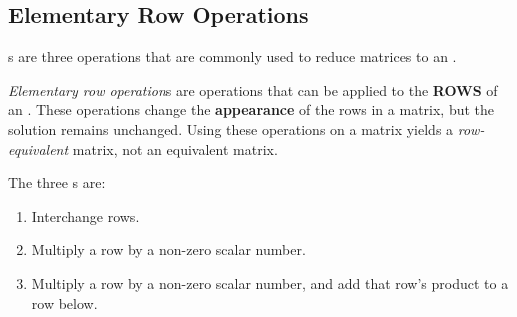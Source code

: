 \subsection{Elementary Row Operations}\label{subsec:Elementary_Row_Ops}
s are three operations that are commonly used to reduce matrices to an .

\begin{definition}\label{def:Elementary_Row_Op}
  \emph{Elementary row operation}s are  operations that can be applied to the \textbf{ROWS} of an .
  These operations change the \textbf{appearance} of the rows in a matrix, but the solution remains unchanged.
  Using these operations on a matrix yields a \emph{row-equivalent} matrix, not an equivalent matrix.
\end{definition}

The three s are:
\begin{enumerate}[noitemsep]
\item Interchange rows.
\item Multiply a row by a non-zero scalar number.
\item Multiply a row by a non-zero scalar number, and add that row's product to a row below.
\end{enumerate}


